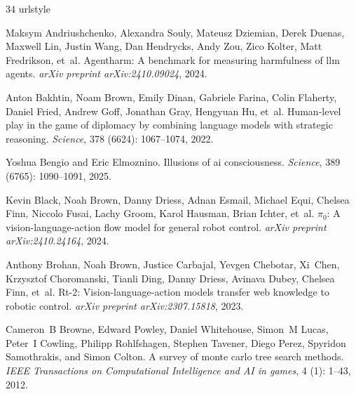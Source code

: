 \begin{thebibliography}{34}
\providecommand{\natexlab}[1]{#1}
\providecommand{\url}[1]{\texttt{#1}}
\expandafter\ifx\csname urlstyle\endcsname\relax
  \providecommand{\doi}[1]{doi: #1}\else
  \providecommand{\doi}{doi: \begingroup \urlstyle{rm}\Url}\fi

Maksym Andriushchenko, Alexandra Souly, Mateusz Dziemian, Derek Duenas, Maxwell Lin, Justin Wang, Dan Hendrycks, Andy Zou, Zico Kolter, Matt Fredrikson, et~al.
\newblock Agentharm: A benchmark for measuring harmfulness of llm agents.
\newblock \emph{arXiv preprint arXiv:2410.09024}, 2024.

Anton Bakhtin, Noam Brown, Emily Dinan, Gabriele Farina, Colin Flaherty, Daniel Fried, Andrew Goff, Jonathan Gray, Hengyuan Hu, et~al.
\newblock Human-level play in the game of diplomacy by combining language models with strategic reasoning.
\newblock \emph{Science}, 378 (6624): 1067--1074, 2022.

Yoshua Bengio and Eric Elmoznino.
\newblock Illusions of ai consciousness.
\newblock \emph{Science}, 389 (6765): 1090--1091, 2025.

Kevin Black, Noah Brown, Danny Driess, Adnan Esmail, Michael Equi, Chelsea Finn, Niccolo Fusai, Lachy Groom, Karol Hausman, Brian Ichter, et~al.
\newblock $\pi_0$: A vision-language-action flow model for general robot control.
\newblock \emph{arXiv preprint arXiv:2410.24164}, 2024.

Anthony Brohan, Noah Brown, Justice Carbajal, Yevgen Chebotar, Xi~Chen, Krzysztof Choromanski, Tianli Ding, Danny Driess, Avinava Dubey, Chelsea Finn, et~al.
\newblock Rt-2: Vision-language-action models transfer web knowledge to robotic control.
\newblock \emph{arXiv preprint arXiv:2307.15818}, 2023.

Cameron~B Browne, Edward Powley, Daniel Whitehouse, Simon~M Lucas, Peter~I Cowling, Philipp Rohlfshagen, Stephen Tavener, Diego Perez, Spyridon Samothrakis, and Simon Colton.
\newblock A survey of monte carlo tree search methods.
\newblock \emph{IEEE Transactions on Computational Intelligence and AI in games}, 4 (1): 1--43, 2012.


\end{thebibliography}

